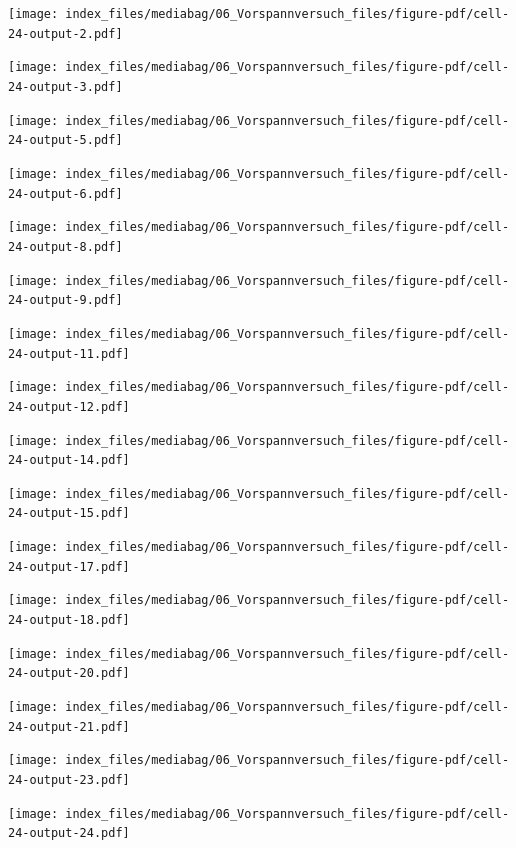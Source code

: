 \documentclass[
  11pt,
  letterpaper,
]{scrreprt}
\begin{document}
\texttt{[image: index\_files/mediabag/06\_Vorspannversuch\_files/figure-pdf/cell-24-output-2.pdf]}

\texttt{[image: index\_files/mediabag/06\_Vorspannversuch\_files/figure-pdf/cell-24-output-3.pdf]}

\newpage{}

\texttt{[image: index\_files/mediabag/06\_Vorspannversuch\_files/figure-pdf/cell-24-output-5.pdf]}

\texttt{[image: index\_files/mediabag/06\_Vorspannversuch\_files/figure-pdf/cell-24-output-6.pdf]}

\newpage{}

\texttt{[image: index\_files/mediabag/06\_Vorspannversuch\_files/figure-pdf/cell-24-output-8.pdf]}

\texttt{[image: index\_files/mediabag/06\_Vorspannversuch\_files/figure-pdf/cell-24-output-9.pdf]}

\newpage{}

\texttt{[image: index\_files/mediabag/06\_Vorspannversuch\_files/figure-pdf/cell-24-output-11.pdf]}

\texttt{[image: index\_files/mediabag/06\_Vorspannversuch\_files/figure-pdf/cell-24-output-12.pdf]}

\newpage{}

\texttt{[image: index\_files/mediabag/06\_Vorspannversuch\_files/figure-pdf/cell-24-output-14.pdf]}

\texttt{[image: index\_files/mediabag/06\_Vorspannversuch\_files/figure-pdf/cell-24-output-15.pdf]}

\newpage{}

\texttt{[image: index\_files/mediabag/06\_Vorspannversuch\_files/figure-pdf/cell-24-output-17.pdf]}

\texttt{[image: index\_files/mediabag/06\_Vorspannversuch\_files/figure-pdf/cell-24-output-18.pdf]}

\newpage{}

\texttt{[image: index\_files/mediabag/06\_Vorspannversuch\_files/figure-pdf/cell-24-output-20.pdf]}

\texttt{[image: index\_files/mediabag/06\_Vorspannversuch\_files/figure-pdf/cell-24-output-21.pdf]}

\newpage{}

\texttt{[image: index\_files/mediabag/06\_Vorspannversuch\_files/figure-pdf/cell-24-output-23.pdf]}

\texttt{[image: index\_files/mediabag/06\_Vorspannversuch\_files/figure-pdf/cell-24-output-24.pdf]}
\end{document}
